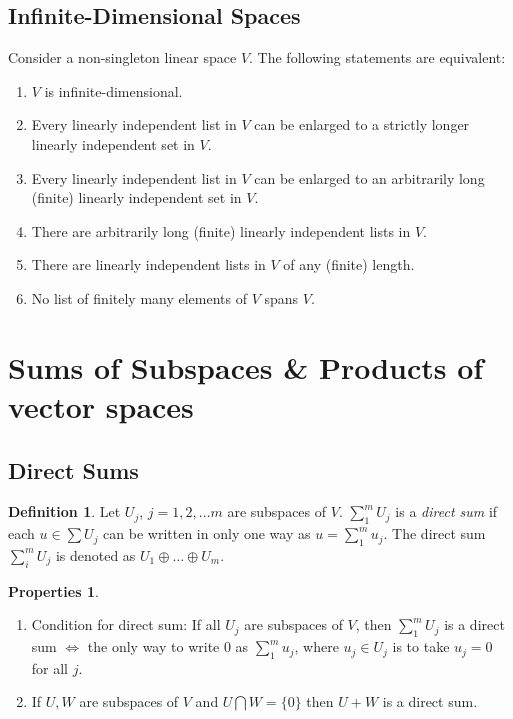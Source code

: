 \documentclass{article}
\theoremstyle{definition}
\newtheorem{defn}{Definition}[section]
\newtheorem{prop}{Properties}[section]
\begin{document}
\subsection{Infinite-Dimensional Spaces}
Consider a non-singleton linear space $V$. The following statements are equivalent:
\begin{enumerate}
	\item $V$ is infinite-dimensional.
	\item Every linearly independent list in $V$ can be enlarged to a strictly longer linearly independent set in $V$.
	\item Every linearly independent list in $V$ can be enlarged to an arbitrarily long (finite) linearly independent set in $V$.
	\item There are arbitrarily long (finite) linearly independent lists in $V$.
	\item There are linearly independent lists in $V$ of any (finite) length.
	\item No list of finitely many elements of $V$ spans $V$.
\end{enumerate}
\newpage
\section{Sums of Subspaces \& Products of vector spaces}
\subsection{Direct Sums}
\begin{defn}
	Let $U_j$, $j=1,2,\dots m$ are subspaces of $V$. $\sum_1^m U_j$ is a \textit{direct sum} if each $u \in \sum U_j$ can be written in only one way as $u = \sum_1^m u_j$. The direct sum $\sum^m_i U_j$ is denoted as $U_1 \oplus\dots\oplus U_m$.
\end{defn}
\begin{prop}
	$\,$
	\begin{enumerate}
		\item Condition for direct sum: If all $U_j$ are subspaces of $V$, then $\sum_1^m U_j$ is a direct sum $\iff$ the only way to write 0 as $\sum_1^m u_j$, where $u_j \in U_j$ is to take $u_j = 0$ for all $j$.  
		\item If $U, W$ are subspaces of $V$ and $U \bigcap W = \{ 0\}$ then $U+W$ is a direct sum. 
	\end{enumerate}
\end{prop}
\end{document}
